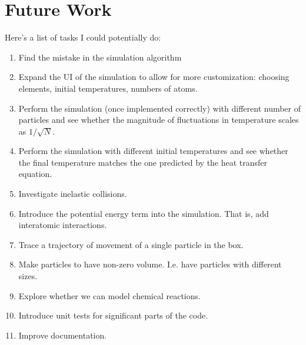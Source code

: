 \documentclass[10pt]{article}
\begin{document}
\section{Future Work}
Here's a list of tasks I could potentially do:

\begin{enumerate}
    \item Find the mistake in the simulation algorithm
    \item Expand the UI of the simulation to allow for more customization: choosing elements, initial temperatures, numbers of atoms. 
    \item Perform the simulation (once implemented correctly) with different number of particles and see whether the magnitude of fluctuations in temperature scales as $1/\sqrt{N}$.
    \item Perform the simulation with different initial temperatures and see whether the final temperature matches the one predicted by the heat transfer equation.
    \item Investigate inelastic collisions.
    \item Introduce the potential energy term into the simulation. That is, add interatomic interactions.
    \item Trace a trajectory of movement of a single particle in the box.
    \item Make particles to have non-zero volume. I.e. have particles with different sizes.
    \item Explore whether we can model chemical reactions.
    \item Introduce unit tests for significant parts of the code.
    \item Improve documentation.
\end{enumerate}
\end{document}
